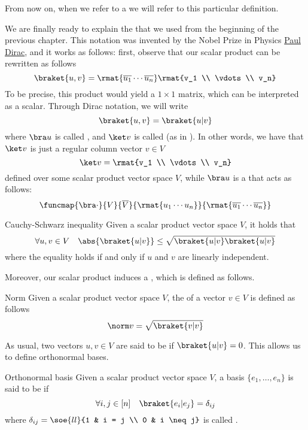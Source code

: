 \documentclass[a4paper, 12pt]{report}
\begin{document}
From now on, when we refer to a  we will refer to this particular definition.

We are finally ready to explain the  that we used from the beginning of the previous chapter. This notation was invented by the Nobel Prize in Physics \href{https://it.wikipedia.org/wiki/Paul_Dirac}{Paul Dirac}, and it works as follows: first, observe that our scalar product can be rewritten as follows $$\braket{u, v} = \rmat{\overline{u_1} \cdots \overline{u_n}} \rmat{v_1 \\ \vdots \\ v_n}$$ To be precise, this product would yield a $1 \times 1$ matrix, which can be interpreted as a scalar. Through Dirac notation, we will write $$\braket{u, v} = \braket{u | v}$$ where $\bra u$ is called , and $\ket v$ is called  (as in ). In other words, we have that $\ket v$ is just a regular column vector $v \in V$ $$\ket v = \rmat{v_1 \\ \vdots \\ v_n}$$ defined over some scalar product vector space $V$, while $\bra u$ is a  that acts as follows: $$\funcmap{\bra \cdot}{V}{\overline V}{\rmat{u_1 \cdots u_n}}{\rmat{\overline{u_1} \cdots \overline{u_n}}}$$

\begin{framedthm}{Cauchy-Schwarz inequality}
	Given a scalar product vector space $V$, it holds that $$\forall u, v \in V \quad \abs{\braket{u|v}} \le \sqrt{\braket{u|v} \braket{u|v}}$$ where the equality holds if and only if $u$ and $v$ are linearly independent.
\end{framedthm}

Moreover, our scalar product induces a , which is defined as follows.

\begin{frameddefn}{Norm}
	Given a scalar product vector space $V$, the  of a vector $v \in V$ is defined as follows $$\norm v = \sqrt{\braket{v|v}}$$
\end{frameddefn}

As usual, two vectors $u, v \in V$ are said to be  if $\braket{u|v} = 0$. This allows us to define orthonormal bases.

\begin{frameddefn}{Orthonormal basis}
	Given a scalar product vector space $V$, a basis $\{e_1, \ldots, e_n\}$ is said to be  if $$\forall i, j \in [n] \quad \braket{e_i | e_j} = \delta_{ij}$$ where $\delta_{ij} = \soe{ll}{1 & i = j \\ 0 & i \neq j}$ is called .
\end{frameddefn}
\end{document}
